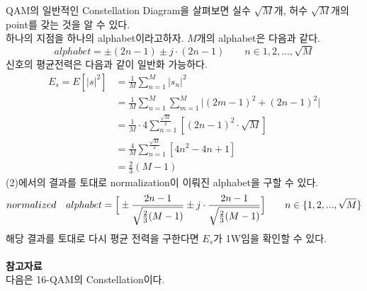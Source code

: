 \documentclass{article}
\newcommand{\bd}{\textbf} %
\providecommand{\abs}[1]{\lvert#1\rvert}
\begin{document}
QAM의 일반적인 Constellation Diagram을 살펴보면 실수 $\sqrt{M}$개, 허수 $\sqrt{M}$개의 point를 갖는 것을 알 수 있다.\\
하나의 지점을 하나의 alphabet이라고하자. $M$개의 alphabet은 다음과 같다.
\begin{equation}
alphabet={\pm(2n-1)\pm j\cdot(2n-1)} \qquad n\in{1,2,...,\sqrt{M}}
\end{equation}
신호의 평균전력은 다음과 같이 일반화 가능하다.
\begin{equation}
\begin{split}
E_s=E[\abs{s}^2]&=\frac{1}{M}\sum_{n=1}^M \abs{s_n}^2\\
&=\frac{1}{M}\sum_{n=1}^M \sum_{m=1}^M \abs{(2m-1)^2+(2n-1)^2}\\
&=\frac{1}{M}\cdot4\sum_{n=1}^\frac{\sqrt{M}}{2}[(2n-1)^2\cdot\sqrt{M}]\\
&=\frac{4}{M}\sum_{n=1}^\frac{\sqrt{M}}{2}[4n^2-4n+1]\\
&=\frac{2}{3}(M-1)
\end{split}
\end{equation}
(2)에서의 결과를 토대로 normalization이 이뤄진 alphabet을 구할 수 있다.
\begin{equation}
normalized\quad alphabet=\Big{[}\pm\frac{2n-1}{\sqrt{\frac{2}{3}(M-1)}}\pm j\cdot\frac{2n-1}{\sqrt{\frac{2}{3}(M-1)}}\Big{]} \qquad n\in\{1,2,...,\sqrt{M}\}
\end{equation}
해당 결과를 토대로 다시 평균 전력을 구한다면 $E_s$가 1W임을 확인할 수 있다.\\
\\
\bd{참고자료}\\
다음은 16-QAM의 Constellation이다.\\
\end{document}

